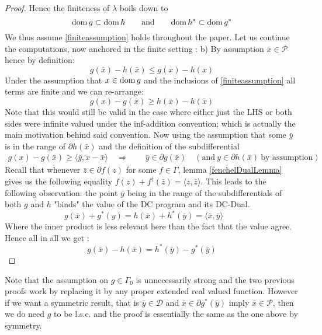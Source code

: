 \begin{proof}
\noindent Hence the finiteness of $\lambda$ boils down to 
\begin{equation}
	\mathrm{dom} \,  g \subset \mathrm{dom} \, h \qquad\text{and}\qquad \mathrm{dom} \, h^* \subset \mathrm{dom} \,
	g^* \label{finiteassumption}
\end{equation}
We thus assume \ref{finiteassumption} holds throughout the paper. Let us continue
the computations, now anchored in the finite setting :
\noindent b) By assumption $\bar x \in \mathcal P$ hence by definition:
\begin{equation*}
	g(\bar x)-h(\bar x) \leq g(x) - h(x)
\end{equation*}
Under the assumption that $x\in\mathrm{dom} \, g$ and the inclusions of
\ref{finiteassumption}
all terms are finite and we can re-arrange:
\begin{equation*}
	g(x)-g(\bar x) \geq h(x)-h(\bar x)
\end{equation*}
Note that this would still be valid in the case where either just 
the LHS or both sides were infinite valued under the inf-addition convention;
which is actually the main motivation behind said convention.
Now using the assumption that some $\bar y$ is in the range of $\partial h(\bar
x)$ and the definition of the subdifferential
\begin{align*}
	g(x)-g(\bar x) \geq \langle\bar y,x-\bar x\rangle  \quad
	\Rightarrow \qquad 
	\bar y \in\partial g(\bar x) 
	\quad (\text{and} \ y\in  \partial  h(\bar x)\ \text{by assumption})
\end{align*}
Recall that whenever $\bar z\in\partial f(z)$ for some $f\in\Gamma$, lemma
\ref{fenchelDualLemma} gives us the following equality $ f(z)+f^\dagger(\bar z) =
\langle z,\bar z\rangle $. This leads to the following observation: the point
$\bar y$ being in the range of the subdifferentials of both $g$ and $h$ "binds"
the value of the DC program and its DC-Dual.
\begin{equation*}
	g(\bar x) + g^*(y) = h(\bar x) + h^*(\bar y) = 
	\langle \bar x,\bar y \rangle \qquad 
\end{equation*}
Where the inner product is less relevant here than the fact that the value agree.
Hence all in all we get :
\begin{equation*}
	g(\bar x) - h(\bar x) = h^*(\bar y) - g^*(\bar y)
\end{equation*}
\end{proof}
Note that the assumption on $g\in \Gamma_0$ is unnecessarily strong and the two
previous proofs work by replacing it  by any proper extended real valued
function. However if we want a symmetric result, that is  $\bar y \in
\mathcal D$ and $\bar x \in \partial g^*(\bar y)$ imply $\bar x \in \mathcal P$,
then we do need $g$ to be l.s.c. and the proof is essentially the same as the
one above by symmetry.
\clearpage

